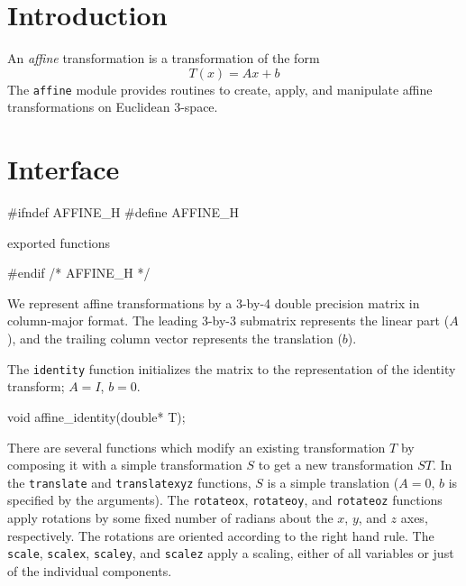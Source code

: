 
\section{Introduction}

An \emph{affine} transformation is a transformation of the form
\[
  T(x) = Ax + b
\]
The {\tt{}affine} module provides routines to create, apply, and
manipulate affine transformations on Euclidean 3-space.


\section{Interface}

\endmoddef
#ifndef AFFINE_H
#define AFFINE_H

\LA{}exported functions~{\nwtagstyle{}}\RA{}

#endif /* AFFINE_H */
\nwendcode{}\nwdocspar

We represent affine transformations by a 3-by-4 double
precision matrix in column-major format.  The leading
3-by-3 submatrix represents the linear part ($A$),
and the trailing column vector represents the translation
($b$).

The {\tt{}identity} function initializes the matrix to the
representation of the identity transform; $A = I$, $b = 0$.

\nwenddocs{}\endmoddef
void affine_identity(double* T);

\nwendcode{}\nwdocspar

There are several functions which modify an existing
transformation $T$ by composing it with a simple transformation
$S$ to get a new transformation $ST$. 
In the {\tt{}translate} and {\tt{}translate{}xyz} functions, $S$ is
a simple translation ($A = 0$, $b$ is specified by the arguments).
The {\tt{}rotate{}ox}, {\tt{}rotate{}oy}, and {\tt{}rotate{}oz} functions
apply rotations by some fixed number of radians about the $x$,
$y$, and $z$ axes, respectively.  The rotations are oriented
according to the right hand rule.  The {\tt{}scale}, {\tt{}scale{}x},
{\tt{}scale{}y}, and {\tt{}scale{}z} apply a scaling, either of all
variables or just of the individual components.

